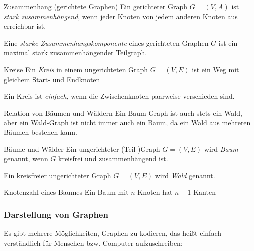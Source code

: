 \documentclass{panikzettel}
\begin{document}
{\begin{thirdboxr}
\begin{defi}{Zusammenhang (gerichtete Graphen)}
		Ein gerichteter Graph $G= (V,A)$ ist \emph{stark zusammenhängend}, wenn jeder Knoten von jedem anderen Knoten aus erreichbar ist.
		
		Eine \emph{starke Zusammenhangskomponente} eines gerichteten Graphen $G$ ist ein maximal stark zusammenhängender Teilgraph.
	\end{defi}
	
\end{thirdboxr}


\begin{halfboxl}
	\vspace{-\baselineskip}
	\begin{defi}{Kreise}
		Ein \emph{Kreis} in einem ungerichteten Graph $G=(V,E)$ ist ein Weg mit gleichem Start- und Endknoten
		
		Ein Kreis ist \emph{einfach}, wenn die Zwischenknoten paarweise verschieden sind.
	\end{defi}

	\begin{theo}{Relation von Bäumen und Wäldern}
		Ein Baum-Graph ist auch stets ein Wald, aber ein Wald-Graph ist nicht immer auch ein Baum, da ein Wald aus mehreren Bäumen bestehen kann.
	\end{theo}

	
\end{halfboxl}%
\begin{halfboxr}
	\vspace{-\baselineskip}
	\begin{defi}{Bäume und Wälder}
		Ein ungerichteter (Teil-)Graph $G= (V,E)$ wird \emph{Baum} genannt, wenn $G$ kreisfrei und zusammenhängend ist.
		
		Ein kreisfreier ungerichteter Graph $G=(V,E)$ wird \emph{Wald} genannt.
	\end{defi}

	\begin{theo}{Knotenzahl eines Baumes}
		Ein Baum mit $n$ Knoten hat $n-1$ Kanten
	\end{theo}

	
\end{halfboxr}

\subsubsection{Darstellung von Graphen}

Es gibt mehrere Möglichkeiten, Graphen zu kodieren, das heißt einfach verständlich für Menschen bzw. Computer aufzuschreiben:

}
\end{document}
